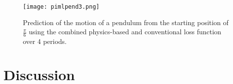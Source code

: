 \documentclass[3p]{elsarticle}
\begin{document}
\begin{figure}
	\centering
	\texttt{[image: pimlpend3.png]}
	\caption{Prediction of the motion of a pendulum from the starting position of $\frac{\pi}{6}$ using the combined physics-based and conventional loss function over 4 periods.}
	\label{pimlpend3}
\end{figure}

\FloatBarrier
\section{Discussion}
\end{document}
